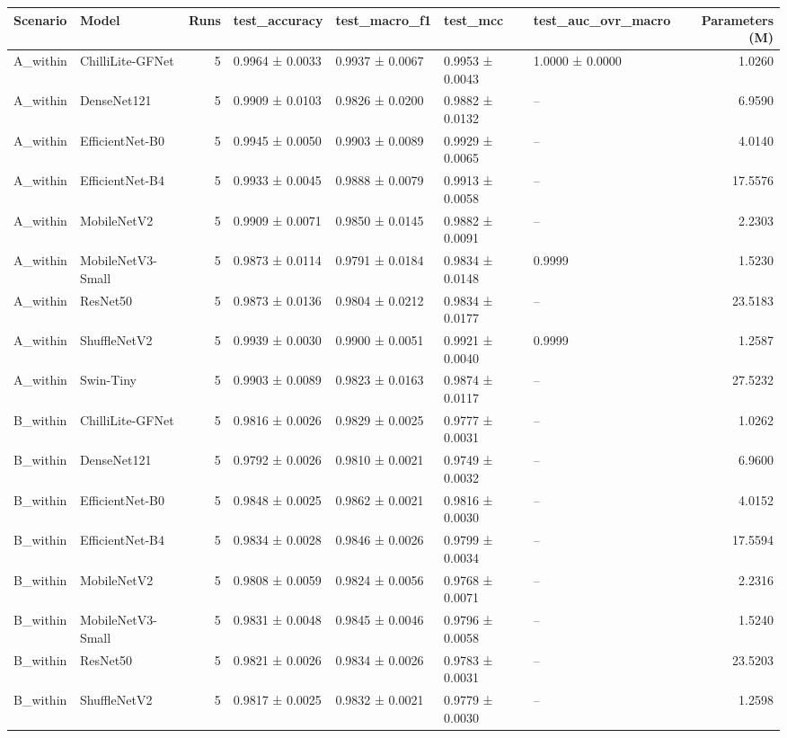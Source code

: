 \begin{tabular}{llrllllr}
\toprule
Scenario & Model & Runs & test\_accuracy & test\_macro\_f1 & test\_mcc & test\_auc\_ovr\_macro & Parameters (M) \\
\midrule
A\_within & ChilliLite-GFNet & 5 & 0.9964 ± 0.0033 & 0.9937 ± 0.0067 & 0.9953 ± 0.0043 & 1.0000 ± 0.0000 & 1.0260 \\
A\_within & DenseNet121 & 5 & 0.9909 ± 0.0103 & 0.9826 ± 0.0200 & 0.9882 ± 0.0132 & -- & 6.9590 \\
A\_within & EfficientNet-B0 & 5 & 0.9945 ± 0.0050 & 0.9903 ± 0.0089 & 0.9929 ± 0.0065 & -- & 4.0140 \\
A\_within & EfficientNet-B4 & 5 & 0.9933 ± 0.0045 & 0.9888 ± 0.0079 & 0.9913 ± 0.0058 & -- & 17.5576 \\
A\_within & MobileNetV2 & 5 & 0.9909 ± 0.0071 & 0.9850 ± 0.0145 & 0.9882 ± 0.0091 & -- & 2.2303 \\
A\_within & MobileNetV3-Small & 5 & 0.9873 ± 0.0114 & 0.9791 ± 0.0184 & 0.9834 ± 0.0148 & 0.9999 & 1.5230 \\
A\_within & ResNet50 & 5 & 0.9873 ± 0.0136 & 0.9804 ± 0.0212 & 0.9834 ± 0.0177 & -- & 23.5183 \\
A\_within & ShuffleNetV2 & 5 & 0.9939 ± 0.0030 & 0.9900 ± 0.0051 & 0.9921 ± 0.0040 & 0.9999 & 1.2587 \\
A\_within & Swin-Tiny & 5 & 0.9903 ± 0.0089 & 0.9823 ± 0.0163 & 0.9874 ± 0.0117 & -- & 27.5232 \\
B\_within & ChilliLite-GFNet & 5 & 0.9816 ± 0.0026 & 0.9829 ± 0.0025 & 0.9777 ± 0.0031 & -- & 1.0262 \\
B\_within & DenseNet121 & 5 & 0.9792 ± 0.0026 & 0.9810 ± 0.0021 & 0.9749 ± 0.0032 & -- & 6.9600 \\
B\_within & EfficientNet-B0 & 5 & 0.9848 ± 0.0025 & 0.9862 ± 0.0021 & 0.9816 ± 0.0030 & -- & 4.0152 \\
B\_within & EfficientNet-B4 & 5 & 0.9834 ± 0.0028 & 0.9846 ± 0.0026 & 0.9799 ± 0.0034 & -- & 17.5594 \\
B\_within & MobileNetV2 & 5 & 0.9808 ± 0.0059 & 0.9824 ± 0.0056 & 0.9768 ± 0.0071 & -- & 2.2316 \\
B\_within & MobileNetV3-Small & 5 & 0.9831 ± 0.0048 & 0.9845 ± 0.0046 & 0.9796 ± 0.0058 & -- & 1.5240 \\
B\_within & ResNet50 & 5 & 0.9821 ± 0.0026 & 0.9834 ± 0.0026 & 0.9783 ± 0.0031 & -- & 23.5203 \\
B\_within & ShuffleNetV2 & 5 & 0.9817 ± 0.0025 & 0.9832 ± 0.0021 & 0.9779 ± 0.0030 & -- & 1.2598 \\

\end{tabular}

